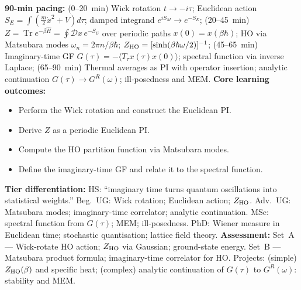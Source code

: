 \documentclass[11pt,a4paper]{article}
\begin{document}
\begin{tcolorbox}[modulebox, title={Module~II.2 --- Lecture L05: Imaginary-Time Path Integrals}]
\textbf{90-min pacing:} (0--20~min) Wick rotation $t\to-i\tau$; Euclidean action $S_E=\int(\tfrac{m}{2}\dot{x}^2+V)d\tau$; damped integrand $e^{iS_M}\to e^{-S_E}$; (20--45~min) $Z=\operatorname{Tr}e^{-\beta\hat{H}}=\oint\mathcal{D}x\,e^{-S_E}$ over periodic paths $x(0)=x(\beta\hbar)$; HO via Matsubara modes $\omega_n=2\pi n/\beta\hbar$; $Z_{\rm HO}=[\sinh(\beta\hbar\omega/2)]^{-1}$; (45--65~min) Imaginary-time GF $G(\tau)=-\langle T_\tau x(\tau)x(0)\rangle$; spectral function via inverse Laplace; (65--90~min) Thermal averages as PI with operator insertion; analytic continuation $G(\tau)\to G^R(\omega)$; ill-posedness and MEM.
\medskip\textbf{Core learning outcomes:}
\begin{itemize}[leftmargin=1.4em,topsep=2pt,itemsep=1pt]
  \item Perform the Wick rotation and construct the Euclidean PI.
  \item Derive $Z$ as a periodic Euclidean PI.
  \item Compute the HO partition function via Matsubara modes.
  \item Define the imaginary-time GF and relate it to the spectral function.
\end{itemize}
\medskip\textbf{Tier differentiation:}
HS: ``imaginary time turns quantum oscillations into statistical weights.''
Beg.\ UG: Wick rotation; Euclidean action; $Z_{\rm HO}$.
Adv.\ UG: Matsubara modes; imaginary-time correlator; analytic continuation.
MSc: spectral function from $G(\tau)$; MEM; ill-posedness.
PhD: Wiener measure in Euclidean time; stochastic quantisation; lattice field theory.
\medskip\textbf{Assessment:}
Set~A --- Wick-rotate HO action; $Z_{\rm HO}$ via Gaussian; ground-state energy.
Set~B --- Matsubara product formula; imaginary-time correlator for HO.
Projects: (simple) $Z_{\rm HO}(\beta)$ and specific heat; (complex) analytic continuation of $G(\tau)$ to $G^R(\omega)$: stability and MEM.
\end{tcolorbox}

\medskip
\end{document}
